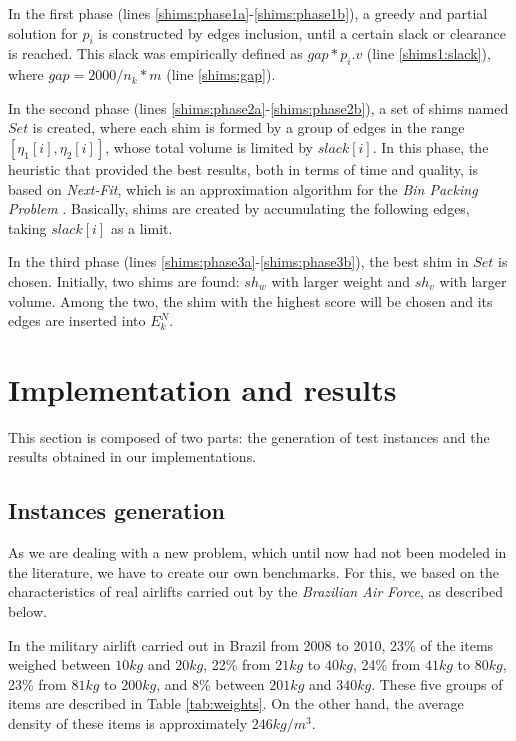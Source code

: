 \documentclass[preprint,authoryear]{elsarticle}
\begin{document}
In the first phase (lines \ref{shims:phase1a}-\ref{shims:phase1b}), a greedy and partial solution for $p_i$\/ is constructed by edges inclusion, until a certain slack or clearance is reached. This slack was empirically defined as $gap * p_i.v$\/ (line \ref{shims1:slack}), where $gap = 2000/n_k*m$\/ (line \ref{shims:gap}).

In the second phase (lines \ref{shims:phase2a}-\ref{shims:phase2b}), a set of shims named $Set$\/ is created, where each shim is formed by a group of edges in the range $[\eta_1[i],\eta_2[i]]$, whose total volume is limited by $slack[i]$. In this phase, the heuristic that provided the best results, both in terms of time and quality, is based on {\it Next-Fit}, which is an approximation algorithm for the {\it Bin Packing Problem}\/ \cite{JohnsonGarey1985}. Basically, shims are created by accumulating the following edges, taking $slack[i]$\/ as a limit.

In the third phase (lines \ref{shims:phase3a}-\ref{shims:phase3b}), the best shim in $Set$\/ is chosen. Initially, two shims are found: $sh_w$\/ with larger weight and $sh_v$\/ with larger volume. Among the two, the shim with the highest score will be chosen and its edges are inserted into $E^N_k$.


\section{Implementation and results}
\label{sec6}

This section is composed of two parts: the generation of test instances and the results obtained in our implementations.


\subsection{Instances generation}
\label{items}


As we are dealing with a new problem, which until now had not been modeled in the literature, we have to create our own benchmarks. For this, we based on the characteristics of real airlifts carried out by the {\em Brazilian Air Force}, as described below.

In the military airlift carried out in Brazil from 2008 to 2010, 23\% of the items weighed between $10kg$ and $20kg$, 22\% from $21kg$ to $40kg$, 24\% from $41kg$ to $80kg$, 23\% from $81kg$ to $200kg$, and 8\% between $201kg$ and $340kg$. These five groups of items are described in Table \ref{tab:weights}. On the other hand, the average density of these items is approximately $246 kg/m^3$.
\end{document}
